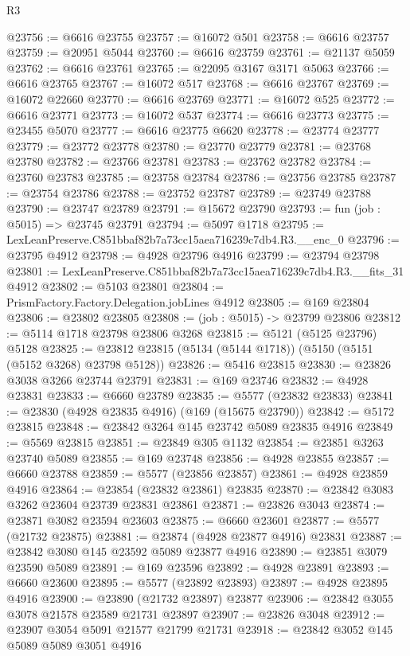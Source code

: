 \begin{lexlean}{R3}
\begin{coremodule}
@23756 := @6616 @23755
@23757 := @16072 @501
@23758 := @6616 @23757
@23759 := @20951 @5044
@23760 := @6616 @23759
@23761 := @21137 @5059
@23762 := @6616 @23761
@23765 := @22095 @3167 @3171 @5063
@23766 := @6616 @23765
@23767 := @16072 @517
@23768 := @6616 @23767
@23769 := @16072 @22660
@23770 := @6616 @23769
@23771 := @16072 @525
@23772 := @6616 @23771
@23773 := @16072 @537
@23774 := @6616 @23773
@23775 := @23455 @5070
@23777 := @6616 @23775 @6620
@23778 := @23774 @23777
@23779 := @23772 @23778
@23780 := @23770 @23779
@23781 := @23768 @23780
@23782 := @23766 @23781
@23783 := @23762 @23782
@23784 := @23760 @23783
@23785 := @23758 @23784
@23786 := @23756 @23785
@23787 := @23754 @23786
@23788 := @23752 @23787
@23789 := @23749 @23788
@23790 := @23747 @23789
@23791 := @15672 @23790
@23793 := fun (job : @5015) => @23745 @23791
@23794 := @5097 @1718
@23795 := LexLeanPreserve.C851bbaf82b7a73cc15aea716239c7db4.R3.__enc_0
@23796 := @23795 @4912
@23798 := @4928 @23796 @4916
@23799 := @23794 @23798
@23801 := LexLeanPreserve.C851bbaf82b7a73cc15aea716239c7db4.R3.__fits_31 @4912
@23802 := @5103 @23801
@23804 := PrismFactory.Factory.Delegation.jobLines @4912
@23805 := @169 @23804
@23806 := @23802 @23805
@23808 := (job : @5015) -> @23799 @23806
@23812 := @5114 @1718 @23798 @23806 @3268
@23815 := @5121 (@5125 @23796) @5128
@23825 := @23812 @23815 (@5134 (@5144 @1718)) (@5150 (@5151 (@5152 @3268) @23798 @5128))
@23826 := @5416 @23815
@23830 := @23826 @3038 @3266 @23744 @23791
@23831 := @169 @23746
@23832 := @4928 @23831
@23833 := @6660 @23789
@23835 := @5577 (@23832 @23833)
@23841 := @23830 (@4928 @23835 @4916) (@169 (@15675 @23790))
@23842 := @5172 @23815
@23848 := @23842 @3264 @145 @23742 @5089 @23835 @4916
@23849 := @5569 @23815
@23851 := @23849 @305 @1132
@23854 := @23851 @3263 @23740 @5089
@23855 := @169 @23748
@23856 := @4928 @23855
@23857 := @6660 @23788
@23859 := @5577 (@23856 @23857)
@23861 := @4928 @23859 @4916
@23864 := @23854 (@23832 @23861) @23835
@23870 := @23842 @3083 @3262 @23604 @23739 @23831 @23861
@23871 := @23826 @3043
@23874 := @23871 @3082 @23594 @23603
@23875 := @6660 @23601
@23877 := @5577 (@21732 @23875)
@23881 := @23874 (@4928 @23877 @4916) @23831
@23887 := @23842 @3080 @145 @23592 @5089 @23877 @4916
@23890 := @23851 @3079 @23590 @5089
@23891 := @169 @23596
@23892 := @4928 @23891
@23893 := @6660 @23600
@23895 := @5577 (@23892 @23893)
@23897 := @4928 @23895 @4916
@23900 := @23890 (@21732 @23897) @23877
@23906 := @23842 @3055 @3078 @21578 @23589 @21731 @23897
@23907 := @23826 @3048
@23912 := @23907 @3054 @5091 @21577 @21799 @21731
@23918 := @23842 @3052 @145 @5089 @5089 @3051 @4916

\end{coremodule}
\end{lexlean}
